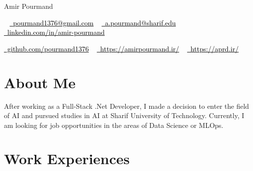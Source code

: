 \documentclass[letterpaper,11pt]{article}
\begin{document}

\begin{center}
    {\Huge 
     Amir Pourmand} \\ \vspace{5pt}

   
  
   
    ~ 
 \href{mailto:pourmand1376@gmail.com}{ 
 	\textcolor{black}{
 	\raisebox{-0.2\height}\faEnvelope\  pourmand1376@gmail.com}}
~ 
 \href{mailto:a.pourmand@sharif.edu}
 {
 	\textcolor{black}{
 	\raisebox{-0.2\height}\faEnvelope\  a.pourmand@sharif.edu}}
\vspace{3pt}
 ~ 
    \href{https://linkedin.com/in/amir-pourmand/}
    { \textcolor{black}{
\raisebox{-0.2\height}
    \faLinkedin\ linkedin.com/in/amir-pourmand}}
    ~
    
    
    \href{https://github.com/pourmand1376}{\textcolor{black}{
    \raisebox{-0.2\height}
    \faGithub\ github.com/pourmand1376}}
    \vspace{-8pt}
    ~ 
    \href{https://amirpourmand.ir/}{
    	\textcolor{black}{
    	\raisebox{-0.2\height}\faGlobe\ https://amirpourmand.ir/}}
    ~ \href{https://aprd.ir/}{
    	\textcolor{black}{
    		\raisebox{-0.2\height}\faGlobe\ https://aprd.ir/}}
    
    \vspace{-8pt}
\end{center}

\vspace{1pt}
\section{About Me}
After working as a Full-Stack .Net Developer, I made a decision to enter the field of AI and pursued studies in AI at Sharif University of Technology. Currently, I am looking for job opportunities in the areas of Data Science or MLOps.


\section{Work Experiences}
\end{document}
